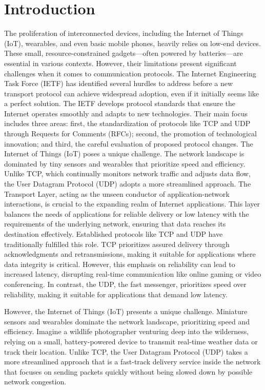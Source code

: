 \documentclass[lettersize,journal]{IEEEtran}
\begin{document}
\section{Introduction}
The proliferation of interconnected devices, including the Internet of Things (IoT), wearables, and even basic mobile phones, heavily relies on low-end devices. These small, resource-constrained gadgets---often powered by batteries---are essential in various contexts. However, their limitations present significant challenges when it comes to communication protocols. The Internet Engineering Task Force (IETF) has identified several hurdles to address before a new transport protocol can achieve widespread adoption, even if it initially seems like a perfect solution. The IETF develops protocol standards that ensure the Internet operates smoothly and adapts to new technologies. Their main focus includes three areas: first, the standardization of protocols like TCP and UDP through Requests for Comments (RFCs); second, the promotion of technological innovation; and third, the careful evaluation of proposed protocol changes. The Internet of Things (IoT) poses a unique challenge. The network landscape is dominated by tiny sensors and wearables that prioritize speed and efficiency. Unlike TCP, which continually monitors network traffic and adjusts data flow, the User Datagram Protocol (UDP) adopts a more streamlined approach. The Transport Layer, acting as the unseen conductor of application-network interactions, is crucial to the expanding realm of Internet applications. This layer balances the needs of applications for reliable delivery or low latency with the requirements of the underlying network, ensuring that data reaches its destination effectively. Established protocols like TCP and UDP have traditionally fulfilled this role. TCP prioritizes assured delivery through acknowledgments and retransmissions, making it suitable for applications where data integrity is critical. However, this emphasis on reliability can lead to increased latency, disrupting real-time communication like online gaming or video conferencing. In contrast, the UDP, the fast messenger, prioritizes speed over reliability, making it suitable for applications that demand low latency.

However, the Internet of Things (IoT) presents a unique challenge. Miniature sensors and wearables dominate the network landscape, prioritizing speed and efficiency. Imagine a wildlife photographer venturing deep into the wilderness, relying on a small, battery-powered device to transmit real-time weather data or track their location. Unlike TCP, the User Datagram Protocol (UDP) takes a more streamlined approach that is a fast-track delivery service inside the network that focuses on sending packets quickly without being slowed down by possible network congestion.
\end{document}
